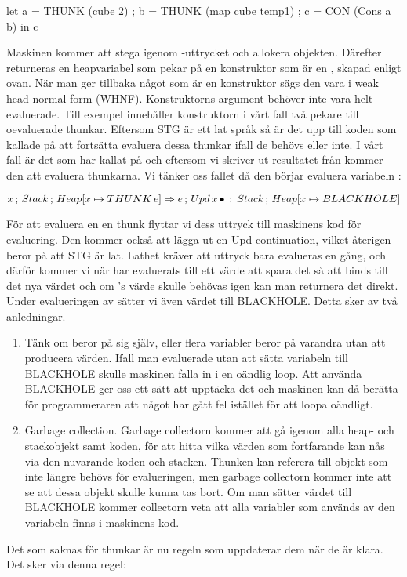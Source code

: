 \documentclass[../Core]{subfiles}
\begin{document}
\begin{codeEx}
let { a = THUNK (cube 2)
    ; b = THUNK (map cube temp1)
    ; c = CON (Cons a b)
    } in c
\end{codeEx}

Maskinen kommer att stega igenom -uttrycket och allokera objekten.
Därefter returneras en heapvariabel som pekar på en konstruktor
som är en , skapad enligt ovan. När man ger tillbaka något som är
en konstruktor sägs den vara i weak head normal form (WHNF). Konstruktorns
argument behöver inte vara helt evaluerade. Till exempel innehåller konstruktorn i vårt fall
två pekare till oevaluerade thunkar. Eftersom STG är ett
lat språk så är det upp till koden som kallade på  att fortsätta
evaluera dessa thunkar ifall de behövs eller inte. I vårt fall är
det  som har kallat på  och eftersom vi skriver ut resultatet från 
kommer den att evaluera thunkarna. Vi tänker oss fallet då den börjar evaluera variabeln :

\[
x\,;\, Stack\,;\, Heap[x\mapsto THUNK\,e]\Rightarrow e\,;\, Upd\, x\,\bullet\,:\, Stack\,;\, Heap[x\mapsto BLACKHOLE]\]

För att evaluera en en thunk flyttar vi dess uttryck till maskinens kod
för evaluering. Den kommer också att lägga ut en Upd-continuation, vilket
återigen beror på att STG är lat. Lathet kräver att uttryck bara evalueras
en gång, och därför kommer vi när  har evaluerats till ett värde att spara
det så att  binds till det nya värdet och om 's värde skulle behövas
igen kan man returnera det direkt. Under evalueringen av  sätter
vi även värdet  till BLACKHOLE. Detta sker av två anledningar.
\begin{enumerate}
\item Tänk om  beror på sig själv, eller flera variabler beror på varandra utan
att producera värden. Ifall man evaluerade utan att sätta variabeln till BLACKHOLE
skulle maskinen falla in i en oändlig loop. Att använda BLACKHOLE ger oss ett sätt att
upptäcka det och maskinen kan då berätta för programmeraren att något har gått fel
istället för att loopa oändligt.
\item Garbage collection. Garbage collectorn kommer att gå igenom alla heap- och stackobjekt
samt koden, för att hitta vilka värden som fortfarande kan nås via den nuvarande
koden och stacken. Thunken kan referera till objekt som inte längre
behövs för evalueringen, men garbage collectorn kommer inte att se att dessa objekt skulle
kunna tas bort. Om man sätter värdet till BLACKHOLE
kommer collectorn veta att alla variabler som används av den variabeln finns
i maskinens kod.
\end{enumerate}
Det som saknas för thunkar är nu regeln som uppdaterar dem när de
är klara. Det sker via denna regel:
\end{document}
